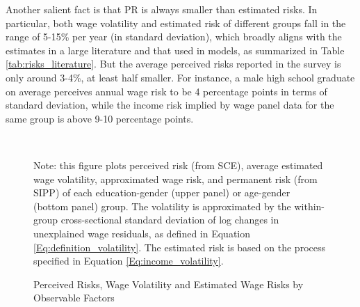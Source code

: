 Another salient fact is that PR is always smaller than estimated risks. In particular, both wage volatility and estimated risk of different groups fall in the range of 5-15\% per year (in standard deviation), which broadly aligns with the estimates in a large literature and that used in models, as summarized in Table \ref{tab:risks_literature}. But the average perceived risks reported in the survey is only around 3-4\%, at least half smaller. For instance, a male high school graduate on average perceives annual wage risk to be 4 percentage points in terms of standard deviation, while the income risk implied by wage panel data for the same group is above 9-10 percentage points. 



    \begin{figure}[!ht]
    	\caption{Perceived Risks, Wage Volatility and Estimated Wage Risks by Observable Factors}
    	\label{fig:group_compare}
    	\begin{center}
    		 \\
    		\medskip
    	\end{center}
    	
    	\begin{flushleft}Note: this figure plots perceived risk (from SCE), average estimated wage volatility, approximated wage risk, and permanent risk (from SIPP) of each education-gender (upper panel) or age-gender (bottom panel) group. The volatility is approximated by the within-group cross-sectional standard deviation of log changes in unexplained wage residuals, as defined in Equation \ref{Eq:definition_volatility}. The estimated risk is based on the process specified in Equation \ref{Eq:income_volatility}.\end{flushleft}
    \end{figure}

